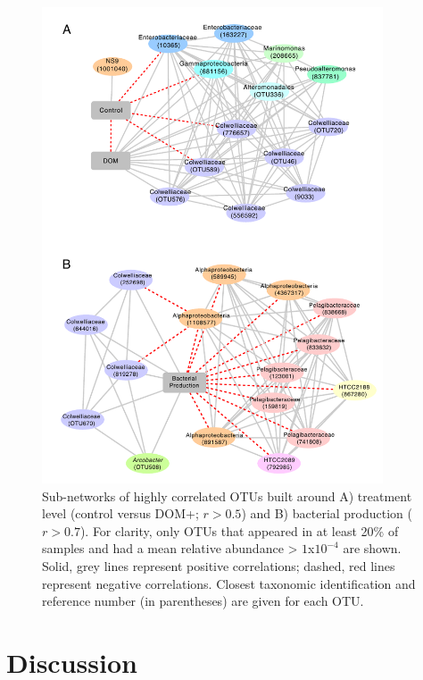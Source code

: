 \begin{figure}[htbp] 
\centering 
\includegraphics[width=0.9\textwidth]{Chapter_4_DOM/Figures/Figure_6_Network}
\caption[Sub-networks of highly correlated OTUs built around treatment level (control versus DOM+ and bacterial production.]{Sub-networks of highly correlated OTUs built around A) treatment level (control versus DOM+; $r > 0.5$) and B) bacterial production ($r > 0.7$). For clarity, only OTUs that appeared in at least 20\% of samples and had a mean relative abundance > $1$x$10^{-4}$ are shown. Solid, grey lines represent positive correlations; dashed, red lines represent negative correlations. Closest taxonomic identification and reference number (in parentheses) are given for each OTU.} 
\label{fig:ch3:network} 
\end{figure}

\section{Discussion}

